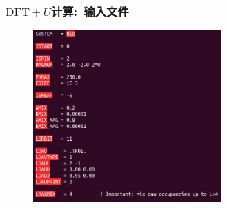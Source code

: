 \frame
{
	\frametitle{$\mathrm{DFT}+U$计算:~输入文件}
\begin{figure}[h!]
	\vskip -7pt
\centering
\includegraphics[height=2.6in,viewport=0 0 690 615,clip]{Figures/NiO-LDA_U-INCAR.png}
\caption{\fontsize{6.2pt}{5.2pt}}%
\label{NiO-LDA_U-INCAR}
\end{figure}
}

